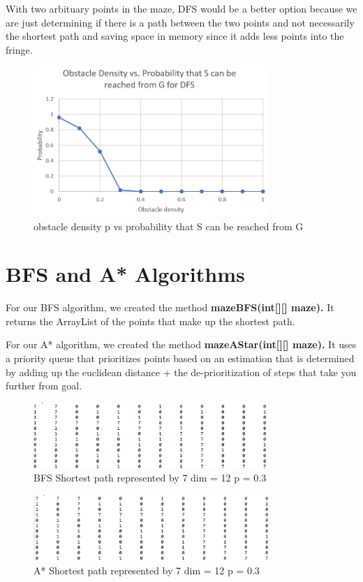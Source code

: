 \documentclass{article}
\begin{document}
	With two arbituary points in the maze, DFS would be a better option because we are just determining if there is a path between the two points and not necessarily the shortest path and saving space in memory since it adds less points into the fringe.
	\begin{figure}[hbt!]

\centering
\includegraphics[width=3.5in]{DFS Plot}

\caption{obstacle density p vs probability that S can be reached from G}
\label{fig:figure2}

\end{figure}

\section{BFS and A* Algorithms}
   For our BFS algorithm, we created the method \textbf{mazeBFS(int[][] maze).} It returns the ArrayList of the points that make up the shortest path.
   
   For our A* algorithm, we created the method \textbf{mazeAStar(int[][] maze).} It uses a priority queue that prioritizes points based on an estimation that is determined by adding up the euclidean distance + the de-prioritization of steps that take you further from goal.
   \begin{figure}[hbt!]
   \centering
\includegraphics[width=3.5in]{BFS}

\caption{BFS Shortest path represented by 7 dim = 12 p = 0.3}
\label{fig:figure1}

\end{figure}

 \begin{figure}[hbt!]
   \centering
\includegraphics[width=3.5in]{astar}

\caption{A* Shortest path represented by 7 dim = 12 p = 0.3}
\label{fig:figure1}

\end{figure}
   
\end{document}
